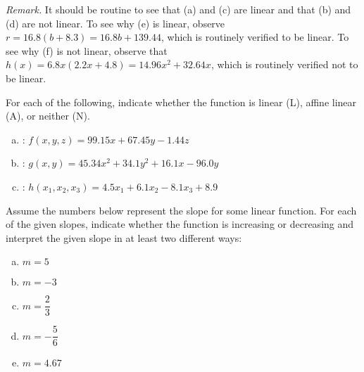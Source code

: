 \documentclass[11pt,letterpaper]{article}
\begin{document}
{\itshape Remark.} It should be routine to see that (a) and (c) are linear and that (b) and (d) are not linear. To see why (e) is linear, observe $r= 16.8(b + 8.3)= 16.8b + 139.44$, which is routinely verified to be linear. To see why (f) is not linear, observe that $h(x)= 6.8x(2.2x + 4.8)= 14.96x^2 + 32.64x$, which is routinely verified not to be linear. 



\newpage



 For each of the following, indicate whether the function is linear (L), affine linear (A), or neither (N). 
	\begin{enumerate}[(a)]
	\item {}: $f(x, y, z)= 99.15x + 67.45y - 1.44z$
	\item {}: $g(x, y)= 45.34x^2 + 34.1y^2 + 16.1x - 96.0y$
	\item {}: $h(x_1, x_2, x_3)= 4.5x_1 + 6.1x_2 - 8.1x_3 + 8.9$
	\end{enumerate}



\newpage



 Assume the numbers below represent the slope for some linear function. For each of the given slopes, indicate whether the function is increasing or decreasing and interpret the given slope in at least two different ways:
	\begin{enumerate}[(a)]
	\item $m= 5$
	\item $m= -3$
	\item $m= \dfrac{2}{3}$
	\item $m= -\dfrac{5}{6}$
	\item $m= 4.67$
	\end{enumerate} \pspace
\end{document}
